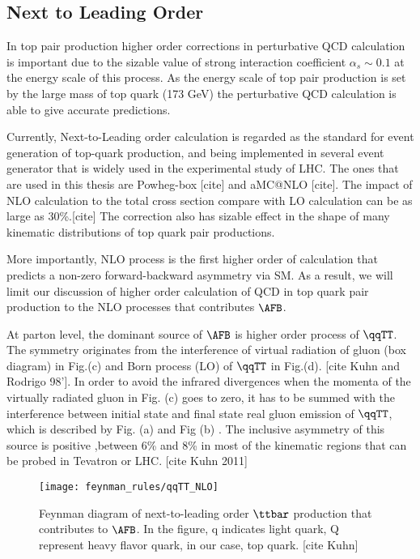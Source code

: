\clearpage

\subsection{Next to Leading Order}
\label{sec:LO production}
In top pair production higher order corrections in perturbative QCD calculation is important due to the sizable value of strong interaction coefficient $\alpha_s\sim 0.1$ at the energy scale of this process. As the energy scale of top pair production is set by the large mass of top quark (173 GeV) the perturbative QCD calculation is able to give accurate predictions. 

Currently, Next-to-Leading order calculation is regarded as the standard for event generation of top-quark production, and being implemented in several event generator that is widely used in the experimental study of LHC. The ones that are used in this thesis are Powheg-box [cite] and aMC@NLO [cite]. The impact of NLO calculation to the total cross section compare with LO calculation can be as large as 30\%.[cite] The correction also has sizable effect in the shape of many kinematic distributions of top quark pair productions. 

More importantly, NLO process is the first higher order of calculation that predicts a non-zero forward-backward asymmetry via SM. As a result, we will limit our discussion of higher order calculation of QCD in top quark pair production to the NLO processes that contributes $\AFB$.

At parton level, the dominant source of $\AFB$ is higher order process of $\qqTT$. The symmetry originates from the interference of virtual radiation of gluon (box diagram) in Fig.(c) and Born process (LO) of $\qqTT$ in Fig.(d). [cite Kuhn and Rodrigo 98']. In order to avoid the infrared divergences when the momenta of the virtually radiated gluon in Fig. (c) goes to zero, it has to be summed with the interference between initial state and final state real gluon emission of $\qqTT$, which is described by Fig. (a) and Fig (b) . The inclusive asymmetry of this source is positive ,between 6\% and 8\% in most of the kinematic regions that can be probed in Tevatron or LHC. [cite Kuhn 2011] 

\begin{figure}[hbt]
	\begin{center}
		\texttt{[image: feynman\_rules/qqTT\_NLO]}
		\caption{\small Feynman diagram of next-to-leading order $\ttbar$ production that contributes to $\AFB$. In the figure, q indicates light quark, Q represent heavy flavor quark, in our case, top quark. [cite Kuhn]}
		\label{fig:qqTT_NLO}
	\end{center}
\end{figure}

